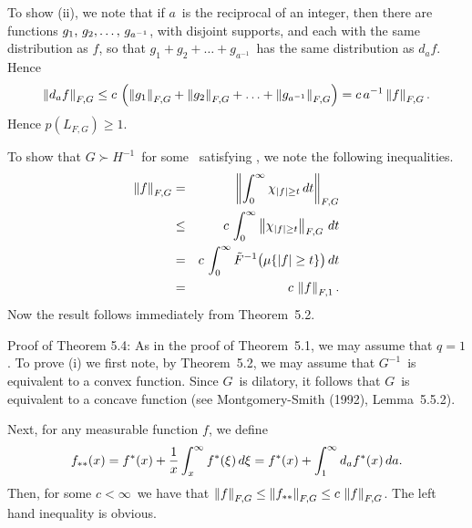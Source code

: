 To show (ii), we note that if $a$\ is the reciprocal of an integer, then 
there
are functions $\listit g,{{a^{-1}}}$, with disjoint supports, and each 
with the
same distribution as $f$, so that $g_1+g_2+\ldots+g_{a^{-1}}$\ has the same
distribution as $d_a f$. Hence
$$ \left\| d_a f \right\|_{F,G}
   \le c\, \left( \left\| g_1 \right\|_{F,G} + \left\| g_2 \right\|_{F,G}
   + \ldots + \left\| g_{a^{-1}} \right\|_{F,G} \right)
   = c\, a^{-1} \left\| f \right\|_{F,G} .$$
Hence $p(L_{F,G}) \ge 1$.

To show that $G\succ H^{-1}$\ for some \Nfunction\ satisfying
\conditionJ, we note the following inequalities.
\begin{eqnarray*}
   \left\| f \right\|_{F,G} &=& \left\| \int_0^\infty 
                      \chi_{\left| f \right| \ge t} \,dt \right\|_{F,G} \\
            &\le& c\, \int_0^\infty \left\| \chi_{\left| f \right| \ge t} \right\|_{F,G} 
                  \,dt \\
            &=& c\, \int_0^\infty \tilde F^{-1}\bigl(
                    \mu\{\left| f \right| \ge t\}\bigr)
                    \,dt \\
            &=& c\, \left\| f \right\|_{F,1} .
\end{eqnarray*}
Now the result follows immediately from Theorem~5.2.
\endproof

\noindent
Proof of Theorem 5.4: As in the proof of Theorem~5.1, we may assume 
that $q=1$. 
To prove (i) we first note, by Theorem~5.2, we may assume that $G^{-1}$\ is
equivalent to  a convex function. Since $G$\ is dilatory, it follows that 
$G$\
is equivalent to a concave function (see Montgomery-Smith (1992), 
Lemma~5.5.2).

Next,
for any measurable function $f$, we define
$$ f_{**}(x) = f^*(x) + {1\over x} \int_x^\infty f^*(\xi) \,d\xi 
   = f^*(x) + \int_1^\infty d_a f^*(x) \,da .$$
Then, for some $c<\infty$\ we
have that $\left\| f \right\|_{F,G} \le \left\| f_{**} \right\|_{F,G} \le c\,\left\| f \right\|_{F,G}$. 
The
left hand inequality is obvious. 


